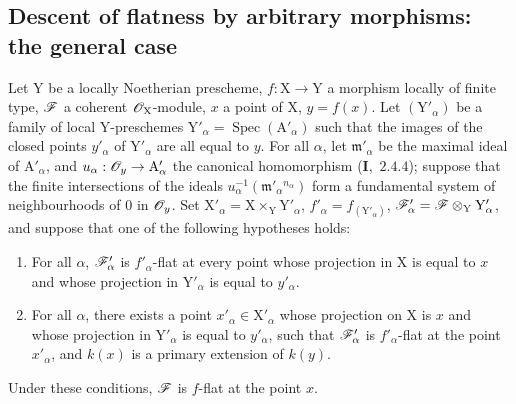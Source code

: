 \subsection{Descent of flatness by arbitrary morphisms: the general case}
\label{subsection:IV.11.5}

\begin{theorem}[11.5.1]
\label{IV.11.5.1}
Let $\mathrm{Y}$ be a locally Noetherian prescheme, $f:\mathrm{X}\to\mathrm{Y}$ a
morphism locally of finite type, $\mathscr{F}$ a coherent $\mathscr{O}_\mathrm{X}$-module, $x$ a point of $\mathrm{X}$, $y=f(x)$. Let $(\mathrm{Y}'_\alpha)$
be a family of local $\mathrm{Y}$-preschemes $\mathrm{Y}'_\alpha=\operatorname{Spec}(\mathrm{A}'_\alpha)$ such that the images of the closed points $y'_\alpha$
of $\mathrm{Y}'_\alpha$ are all equal to $y$. For all $\alpha$, let $\mathfrak{m}'_\alpha$ be the maximal ideal of $\mathrm{A}'_\alpha$, and $u_\alpha:\mathscr{O}_y\to\mathrm{A}'_\alpha$
the canonical homomorphism (\textbf{I},~$2.4.4$); suppose that the finite intersections of the ideals
$u_\alpha^{-1}(\mathfrak{m}'_\alpha{}^{n_\alpha})$
form a fundamental system of neighbourhoods of $0$ in $\mathscr{O}_y$. Set $\mathrm{X}'_\alpha=\mathrm{X}\times_\mathrm{Y}\mathrm{Y}'_\alpha$, $f'_\alpha=f_{(\mathrm{Y}'_\alpha)}$,
$\mathscr{F}'_\alpha=\mathscr{F}\otimes_\mathrm{Y}\mathrm{Y}'_\alpha$, and suppose that one of the following hypotheses holds:
\begin{enumerate}[label=(\roman*)]
  \item For all $\alpha$, $\mathscr{F}'_\alpha$ is $f'_\alpha$-flat at every point whose projection in $\mathrm{X}$ is equal
  to $x$ and whose projection in $\mathrm{Y}'_\alpha$ is equal to $y'_\alpha$.
  \item For all $\alpha$, there exists a point $x'_\alpha\in\mathrm{X}'_\alpha$ whose projection on $\mathrm{X}$ is $x$ and whose projection in $\mathrm{Y}'_\alpha$
  is equal to $y'_\alpha$, such that $\mathscr{F}'_\alpha$ is $f'_\alpha$-flat at the point $x'_\alpha$, and $k(x)$ is a primary extension of $k(y)$.
\end{enumerate}

Under these conditions, $\mathscr{F}$ is $f$-flat at the point $x$.
\end{theorem}

